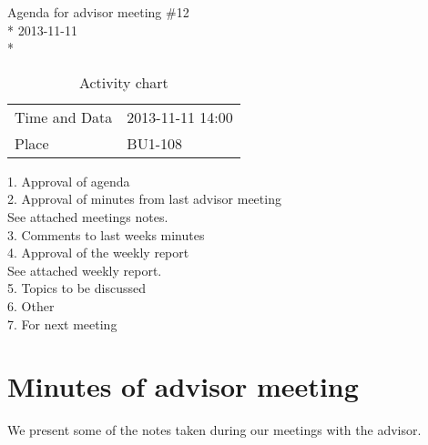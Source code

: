 \begin{center}
Agenda for advisor meeting \#12\\*
2013-11-11\\*
\end{center}

\begin{table}[H]
\begin{center}
\begin{tabular}{ l | l }
Time and Data & 2013-11-11 14:00 \\
Place & BU1-108 \\
\end{tabular}
\end{center}
\caption{Activity chart}
\label{table:activityChartAdvisorAgendaWeek46}
\end{table}


1. Approval of agenda \\
2. Approval of minutes from last advisor meeting \\
See attached meetings notes. \\
3. Comments to last weeks minutes \\
4. Approval of the weekly report \\
See attached weekly report. \\
5. Topics to be discussed \\
6. Other \\
7. For next meeting \\

\fi
\section{Minutes of advisor meeting}

We present some of the notes taken during our meetings with the advisor.

